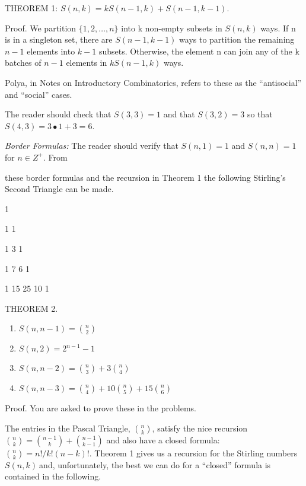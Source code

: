 \documentclass[10pt,letter]{article}
\begin{document}
THEOREM 1:
\(S\left( n,k \right) = kS\left( n - 1,k \right) + S(n - 1,k - 1)\).

Proof. We partition \(\{ 1,2,\ldots,n\}\) into k non-empty subsets in
\(S(n,k)\) ways. If n is in a singleton set, there are
\(S(n - 1,k - 1)\) ways to partition the remaining \(n - 1\) elements
into \(k - 1\) subsets. Otherwise, the element n can join any of the k
batches of \(n - 1\) elements in \(kS(n - 1,k)\) ways.

Polya, in Notes on Introductory Combinatorics, refers to these as the
``antisocial'' and ``social'' cases.

The reader should check that \(S\left( 3,3 \right) = 1\) and that
\(S\left( 3,2 \right) = 3\) so that
\(S\left( 4,3 \right) = 3 \bullet 1 + 3 = 6\).

\emph{Border Formulas:} The reader should verify that
\(S\left( n,1 \right) = 1\) and \(S\left( n,n \right) = 1\) for
\(n \in Z^{+}\). From

these border formulas and the recursion in Theorem 1 the following
Stirling's Second Triangle can be made.

1

1 1

1 3 1

1 7 6 1

1 15 25 10 1

THEOREM 2.
\begin{enumerate}
\def\labelenumi{(\alph{enumi})}

\item
  \(S\left( n,n - 1 \right) =\binom{n}{2}
\)
\item
  \(S\left( n,2 \right) = 2^{n - 1} - 1\)
\item
  \(S\left( n,n - 2 \right) =\binom{n}{3}
 + 3\binom{n}{4}
\)
\item
  \(S\left( n,n - 3 \right) =\binom{n}{4}
 + 10\binom{n}{5}
 + 15\binom{n}{6}
\)

\end{enumerate}

Proof. You are asked to prove these in the problems.

The entries in the Pascal Triangle, \(\binom{n}{k}
\), satisfy the nice recursion \(\binom{n}{k}
 =
\binom{n - 1}{k}
 +\binom{n - 1}{k - 1}
\) and also have a closed formula: \(\binom{n}{k}
 = n!/k!\left( n - k \right)!\). Theorem 1 gives us a
recursion for the Stirling numbers \(S\left( n,k \right)\ \)and,
unfortunately, the best we can do for a ``closed'' formula is contained
in the following.
\end{document}
